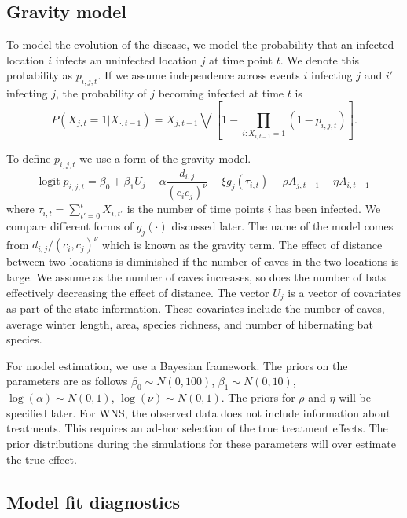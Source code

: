 \documentclass[11pt]{article}
\newcommand{\logit}{\text{logit}}
\begin{document}
\subsection{Gravity model}
\label{sec-2-1}

To model the evolution of the disease, we model the probability that
an infected location $i$ infects an uninfected location $j$ at time
point $t$.  We denote this probability as $p_{i,j,t}$.  If we assume
independence across events $i$ infecting $j$ and $i'$ infecting $j$,
the probability of $j$ becoming infected at time $t$ is
\begin{equation*}
  P(X_{j,t} = 1 | X_{\cdot,t-1}) = X_{j,t-1} \bigvee \left[1 - \prod_{i:
      X_{i,t-1} = 1} ( 1 - p_{i,j,t} ) \right].
\end{equation*}

To define $p_{i,j,t}$ we use a form of the gravity model.
\begin{equation*}
  \logit \; p_{i,j,t} = \beta_0 + \beta_1 U_j 
  - \alpha \frac{d_{i,j}}{(c_ic_j)^\nu} - \xi g_j(\tau_{i,t})
  - \rho A_{j,t-1} - \eta A_{i,t-1}
\end{equation*}
where $\tau_{i,t} = \sum_{t' = 0}^t X_{i,t'}$ is the number of time
points $i$ has been infected.  We compare different forms of
$g_j(\cdot)$ discussed later.  The name of the model comes from
$d_{i,j}/(c_i,c_j)^\nu$ which is known as the gravity term.  The
effect of distance between two locations is diminished if the number
of caves in the two locations is large.  We assume as the number of
caves increases, so does the number of bats effectively decreasing the
effect of distance.  The vector $U_j$ is a vector of covariates as
part of the state information.  These covariates include the number of
caves, average winter length, area, species richness, and number of
hibernating bat species.

For model estimation, we use a Bayesian framework.  The priors on the
parameters are as follows $\beta_0 \sim N(0,100)$, $\beta_1 \sim
   N(0,10)$, $\log(\alpha) \sim N(0,1)$, $\log(\nu) \sim N(0,1)$.  The
priors for $\rho$ and $\eta$ will be specified later.  For WNS, the
observed data does not include information about treatments.  This
requires an ad-hoc selection of the true treatment effects.  The prior
distributions during the simulations for these parameters will over
estimate the true effect.

\subsection{Model fit diagnostics}
\label{sec-2-2}
\end{document}
